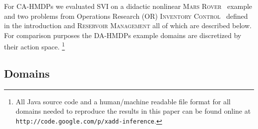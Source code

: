\documentclass[twoside,11pt]{article}
\newcommand{\MarsRover}{\textsc{Mars Rover }}
\newcommand{\Knapsack}{\textsc{Knapsack}}
\newcommand{\InventoryControl}{\textsc{Inventory Control }}
\newcommand{\WaterReservoir}{\textsc{Reservoir Management }}
\begin{document}
For CA-HMDPs we evaluated SVI on a didactic nonlinear
\MarsRover\ example and two problems from Operations Research (OR) \InventoryControl\ defined in the introduction and \WaterReservoir  all of which are described below. For comparison purposes the DA-HMDPs example domains are discretized by their action space. \footnote{All Java source code and a human/machine readable file format for all domains needed to reproduce
the results in this paper can be found online at
\texttt{http://code.google.com/p/xadd-inference}.}

\subsection{Domains}

%
%
%
\end{document}
